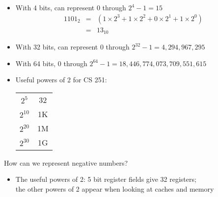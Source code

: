 \begin{frame}[fragile]
\begin{itemize}
\item With 4 bits, can represent 0 through $2^4-1=15$
\begin{eqnarray*}
1101_2 & = & (1\times 2^3 + 1 \times 2^2 + 0 \times 2^1 
               + 1 \times 2^0) \\
& = & 13_{10} 
\end{eqnarray*}
\item With 32 bits, can represent 0 through $2^{32}-1 = 4,294,967,295$

  \item With 64 bits, 0 through $2^{64}-1=18,446,774,073,709,551,615$
\item Useful powers of 2 for CS 251:
\begin{center}
\begin{tabular}{cc}
	$2^{5}$ & 32\\
	$2^{10}$ & 1K\\
	$2^{20}$ & 1M\\
	$2^{30}$ & 1G\\
\end{tabular}
\end{center}
\end{itemize}
\begin{tcolorbox}[enhanced,attach boxed title to top center={yshift=-3mm,yshifttext=-1mm},
  colback=blue!5!white,colframe=blue!75!black,colbacktitle=blue!80!black,
  title=Think About It,fonttitle=\bfseries,
  boxed title style={size=small,colframe=red!50!black} ]
   How can we represent negative numbers?
\end{tcolorbox}

\BNotes\ifnum{}
\begin{itemize}
	\item The useful powers of 2: 5 bit register fields give 32 registers;\\
			the other powers of 2 appear when looking at caches and memory
\end{itemize}
\fi\ENotes
\end{frame}

